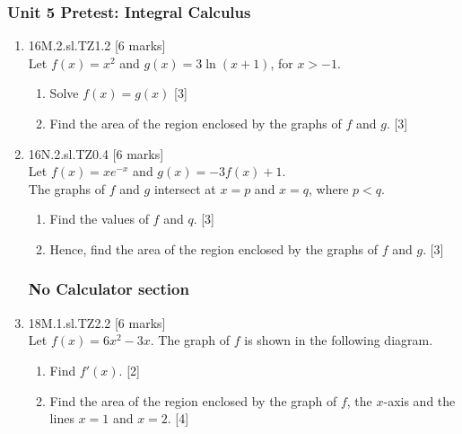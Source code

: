 \documentclass[12pt, twoside]{article}
\begin{document}
\subsubsection*{Unit 5 Pretest: Integral Calculus} 
 \begin{enumerate}

\subsubsection*{Using the calculator for definite integrals}

   \item 16M.2.sl.TZ1.2 \hfill [6 marks]\\
   Let $f(x)=x^2$ and $g(x)=3 \ln (x+1)$, for $x>-1$.
   \begin{enumerate}
     \item Solve $f(x)=g(x)$ \hfill [3]
     \item Find the area of the region enclosed by the graphs of $f$ and $g$. \hfill [3]
   \end{enumerate}


   \item 16N.2.sl.TZ0.4 \hfill [6 marks]\\
   Let $f(x)=xe^{-x}$ and $g(x)=-3f(x)+1$.\\
   The graphs of $f$ and $g$ intersect at $x=p$ and $x=q$, where $p<q$.
   \begin{enumerate}
     \item Find the values of $f$ and $q$. \hfill [3]
     \item Hence, find the area of the region enclosed by the graphs of $f$ and $g$. \hfill [3]
   \end{enumerate}

\subsubsection*{No Calculator section}

  \item 18M.1.sl.TZ2.2 \hfill [6 marks]\\
  Let $f(x)=6x^2-3x$. The graph of $f$ is shown in the following diagram.
    \begin{center}
    \end{center}
    \begin{enumerate}
      \item Find $f'(x)$. \hfill [2]
      \item Find the area of the region enclosed by the graph of $f$, the $x$-axis and the lines $x = 1$ and $x = 2$. \hfill [4]
    \end{enumerate}


\end{enumerate}
\end{document}
